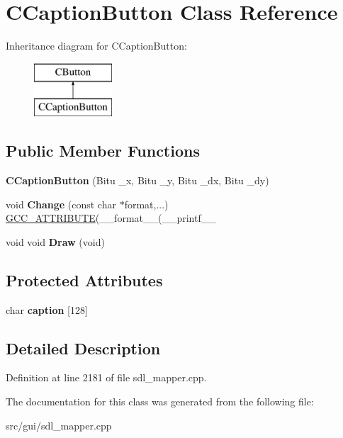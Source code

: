 \hypertarget{classCCaptionButton}{\section{C\-Caption\-Button Class Reference}
\label{classCCaptionButton}
}
Inheritance diagram for C\-Caption\-Button\-:\begin{figure}[H]
\begin{center}
\leavevmode
\includegraphics[height=2.000000cm]{classCCaptionButton}
\end{center}
\end{figure}
\subsection*{Public Member Functions}
\begin{DoxyCompactItemize}
\item 
\hypertarget{classCCaptionButton_ab3693869d536d69e5a5c206f22865583}{{\bfseries C\-Caption\-Button} (Bitu \-\_\-x, Bitu \-\_\-y, Bitu \-\_\-dx, Bitu \-\_\-dy)}\label{classCCaptionButton_ab3693869d536d69e5a5c206f22865583}

\item 
\hypertarget{classCCaptionButton_a497661808a80201830f2241f75750e90}{void {\bfseries Change} (const char $\ast$format,...) \hyperlink{structGCC__ATTRIBUTE}{G\-C\-C\-\_\-\-A\-T\-T\-R\-I\-B\-U\-T\-E}(\-\_\-\-\_\-format\-\_\-\-\_\-(\-\_\-\-\_\-printf\-\_\-\-\_\-}\label{classCCaptionButton_a497661808a80201830f2241f75750e90}

\item 
\hypertarget{classCCaptionButton_a953f5b12ba13b61bc373fc3d25295079}{void void {\bfseries Draw} (void)}\label{classCCaptionButton_a953f5b12ba13b61bc373fc3d25295079}

\end{DoxyCompactItemize}
\subsection*{Protected Attributes}
\begin{DoxyCompactItemize}
\item 
\hypertarget{classCCaptionButton_a6e015cc9759137aa04d7c54bd936233b}{char {\bfseries caption} \mbox{[}128\mbox{]}}\label{classCCaptionButton_a6e015cc9759137aa04d7c54bd936233b}

\end{DoxyCompactItemize}


\subsection{Detailed Description}


Definition at line 2181 of file sdl\-\_\-mapper.\-cpp.



The documentation for this class was generated from the following file\-:\begin{DoxyCompactItemize}
\item 
src/gui/sdl\-\_\-mapper.\-cpp\end{DoxyCompactItemize}
